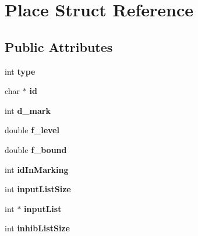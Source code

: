 \hypertarget{structPlace}{\section{Place Struct Reference}
\label{structPlace}
}
\subsection*{Public Attributes}
\begin{DoxyCompactItemize}
\item 
\hypertarget{structPlace_a264998153dfb8bb1f7d9202a45a1def0}{int {\bfseries type}}\label{structPlace_a264998153dfb8bb1f7d9202a45a1def0}

\item 
\hypertarget{structPlace_a441acc01591c4f77dcb5f3edff53ad03}{char $\ast$ {\bfseries id}}\label{structPlace_a441acc01591c4f77dcb5f3edff53ad03}

\item 
\hypertarget{structPlace_a638f6de89a591d32a815d80574843542}{int {\bfseries d\-\_\-mark}}\label{structPlace_a638f6de89a591d32a815d80574843542}

\item 
\hypertarget{structPlace_a528bafcfd5669c17c37967a7139d1aa2}{double {\bfseries f\-\_\-level}}\label{structPlace_a528bafcfd5669c17c37967a7139d1aa2}

\item 
\hypertarget{structPlace_abdea44022e73ec2734ca67f20bc1abb8}{double {\bfseries f\-\_\-bound}}\label{structPlace_abdea44022e73ec2734ca67f20bc1abb8}

\item 
\hypertarget{structPlace_a10b39e364e9b62f5ec688abf35c43f22}{int {\bfseries id\-In\-Marking}}\label{structPlace_a10b39e364e9b62f5ec688abf35c43f22}

\item 
\hypertarget{structPlace_a99267082e0e6e468f661688713695dd9}{int {\bfseries input\-List\-Size}}\label{structPlace_a99267082e0e6e468f661688713695dd9}

\item 
\hypertarget{structPlace_aa665e7b3206caf91f0e76c5eeeec81f2}{int $\ast$ {\bfseries input\-List}}\label{structPlace_aa665e7b3206caf91f0e76c5eeeec81f2}

\item 
\hypertarget{structPlace_ad52b3bc842fd34d1c627c77b8003c935}{int {\bfseries inhib\-List\-Size}}\label{structPlace_ad52b3bc842fd34d1c627c77b8003c935}


\end{DoxyCompactItemize}
